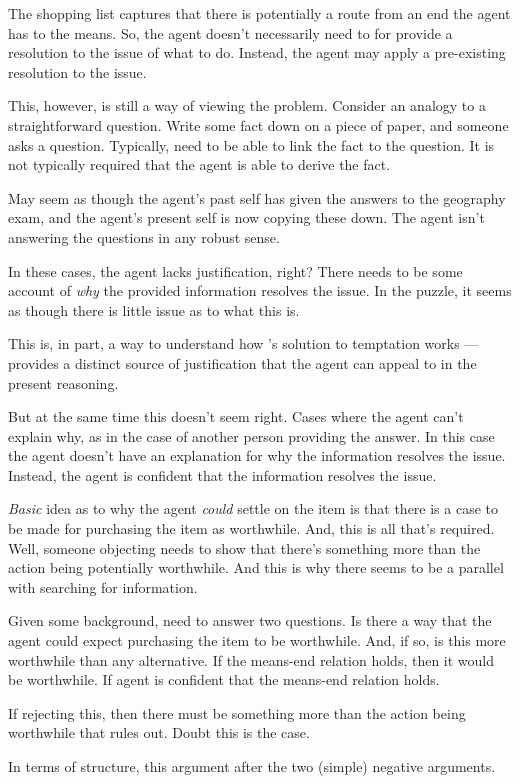 \documentclass[10pt]{article}
\begin{document}
\begin{wodge}
  The shopping list captures that there is potentially a route from an end the agent has to the means.
  So, the agent doesn't necessarily need to for provide a resolution to the issue of what to do.
  Instead, the agent may apply a pre-existing resolution to the issue.

  This, however, is still a way of viewing the problem.
  Consider an analogy to a straightforward question.
  Write some fact down on a piece of paper, and someone asks a question.
  Typically, need to be able to link the fact to the question.
  It is not typically required that the agent is able to derive the fact.

  May seem as though the agent's past self has given the answers to the geography exam, and the agent's present self is now copying these down.
  The agent isn't answering the questions in any robust sense.

  In these cases, the agent lacks justification, right?
  There needs to be some account of \emph{why} the provided information resolves the issue.
  In the puzzle, it seems as though there is little issue as to what this is.

  This is, in part, a way to understand how \citeauthor{Bratman:2007ab}'s solution to temptation works --- \citeauthor{Bratman:2007ab} provides a distinct source of justification that the agent can appeal to in the present reasoning.

  But at the same time this doesn't seem right.
  Cases where the agent can't explain why, as in the case of another person providing the answer.
  In this case the agent doesn't have an explanation for why the information resolves the issue.
  Instead, the agent is confident that the information resolves the issue.

  \emph{Basic} idea as to why the agent \emph{could} settle on the item is that there is a case to be made for purchasing the item as worthwhile.
  And, this is all that's required.
  Well, someone objecting needs to show that there's something more than the action being potentially worthwhile.
  And this is why there seems to be a parallel with searching for information.

  Given some background, need to answer two questions.
  Is there a way that the agent could expect purchasing the item to be worthwhile.
  And, if so, is this more worthwhile than any alternative.
  If the means-end relation holds, then it would be worthwhile.
  If agent is confident that the means-end relation holds.

  If rejecting this, then there must be something more than the action being worthwhile that rules out.
  Doubt this is the case.

  In terms of structure, this argument after the two (simple) negative arguments.
  
\end{wodge}
\end{document}
